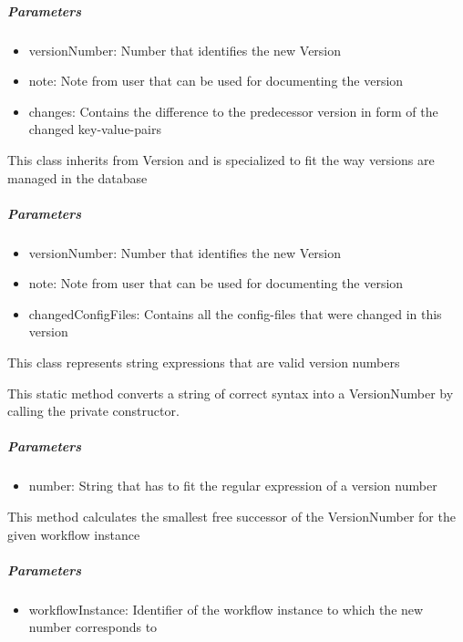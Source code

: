 \subparagraph{Parameters}
\begin{itemize}
	\item{versionNumber:}
	Number that identifies the new Version
	\item{note:}
	Note from user that can be used for documenting the version
	\item{changes:}
	Contains the difference to the predecessor version in form of the changed key-value-pairs
\end{itemize}

This class inherits from Version and is specialized to fit the way versions are managed in the database
\constructor


\subparagraph{Parameters}
\begin{itemize}
	\item{versionNumber:}
	Number that identifies the new Version
	\item{note:}
	Note from user that can be used for documenting the version
	\item{changedConfigFiles:}
	Contains all the config-files that were changed in this version
\end{itemize}


This class represents string expressions that are valid version numbers
\methods

This static method converts a string of correct syntax into a VersionNumber by calling the private constructor.

\subparagraph{Parameters}
\begin{itemize}
	\item{number:}
	String that has to fit the regular expression of a version number
\end{itemize}

This method calculates the smallest free successor of the VersionNumber for the given workflow instance

\subparagraph{Parameters}
\begin{itemize}
	\item{workflowInstance:}
	Identifier of the workflow instance to which the new number corresponds to
\end{itemize}

